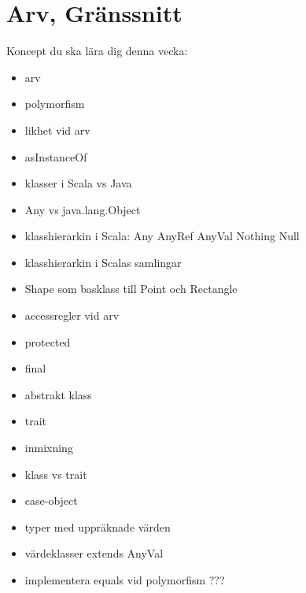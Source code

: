 \chapter{Arv, Gränssnitt}\label{chapter:W07}
Koncept du ska lära dig denna vecka:
\begin{multicols}{2}\begin{itemize}[nosep,label={$\square$},leftmargin=*]
\item arv
\item polymorfism
\item likhet vid arv
\item asInstanceOf
\item klasser i Scala vs Java
\item Any vs java.lang.Object
\item klasshierarkin i Scala: Any AnyRef AnyVal Nothing Null
\item klasshierarkin i Scalas samlingar
\item Shape som basklass till Point och Rectangle
\item accessregler vid arv
\item protected
\item final
\item abstrakt klass
\item trait
\item inmixning
\item klass vs trait
\item case-object
\item typer med uppräknade värden
\item värdeklasser extends AnyVal
\item implementera equals vid polymorfism ???\end{itemize}\end{multicols}
